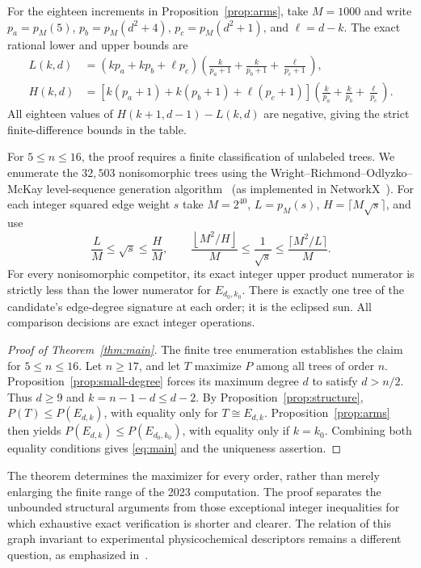 \documentclass[11pt,a4paper]{article}
\numberwithin{equation}{section}
\newcommand{\floor}[1]{\left\lfloor #1\right\rfloor}
\begin{document}
For the eighteen increments in Proposition~\ref{prop:arms}, take $M=1000$ and write $p_a=p_M(5)$, $p_b=p_M(d^2+4)$, $p_c=p_M(d^2+1)$, and $\ell=d-k$. The exact rational lower and upper bounds are
\begin{align*}
L(k,d)&=(kp_a+kp_b+\ell p_c)\left(\frac{k}{p_a+1}+\frac{k}{p_b+1}+\frac{\ell}{p_c+1}\right),\\
H(k,d)&=[k(p_a+1)+k(p_b+1)+\ell(p_c+1)]\left(\frac{k}{p_a}+\frac{k}{p_b}+\frac{\ell}{p_c}\right).
\end{align*}
All eighteen values of $H(k+1,d-1)-L(k,d)$ are negative, giving the strict finite-difference bounds in the table.

For $5\le n\le16$, the proof requires a finite classification of unlabeled trees. We enumerate the $32{,}503$ nonisomorphic trees using the Wright--Richmond--Odlyzko--McKay level-sequence generation algorithm~\cite{WROM1986} (as implemented in NetworkX~\cite{NetworkX}). For each integer squared edge weight $s$ take $M=2^{40}$, $L=p_M(s)$, $H=\lceil M\sqrt s\rceil$, and use
\[
\frac{L}{M}\le\sqrt{s}\le\frac{H}{M},\qquad
\frac{\floor{M^2/H}}{M}\le\frac1{\sqrt{s}}
\le\frac{\lceil M^2/L\rceil}{M}.
\]
For every nonisomorphic competitor, its exact integer upper product numerator is strictly less than the lower numerator for $E_{d_0,k_0}$. There is exactly one tree of the candidate's edge-degree signature at each order; it is the eclipsed sun. All comparison decisions are exact integer operations.

\begin{proof}[Proof of Theorem~\ref{thm:main}]
The finite tree enumeration establishes the claim for $5\le n\le16$. Let $n\ge17$, and let $T$ maximize $P$ among all trees of order $n$. Proposition~\ref{prop:small-degree} forces its maximum degree $d$ to satisfy $d>n/2$. Thus $d\ge9$ and $k=n-1-d\le d-2$. By Proposition~\ref{prop:structure},
$P(T)\le P(E_{d,k})$, with equality only for $T\cong E_{d,k}$. Proposition~\ref{prop:arms} then yields
$P(E_{d,k})\le P(E_{d_0,k_0})$, with equality only if $k=k_0$. Combining both equality conditions gives \eqref{eq:main} and the uniqueness assertion.
\end{proof}

The theorem determines the maximizer for every order, rather than merely enlarging the finite range of the 2023 computation. The proof separates the unbounded structural arguments from those exceptional integer inequalities for which exhaustive exact verification is shorter and clearer. The relation of this graph invariant to experimental physicochemical descriptors remains a different question, as emphasized in~\cite{GRF2023}.
\end{document}
